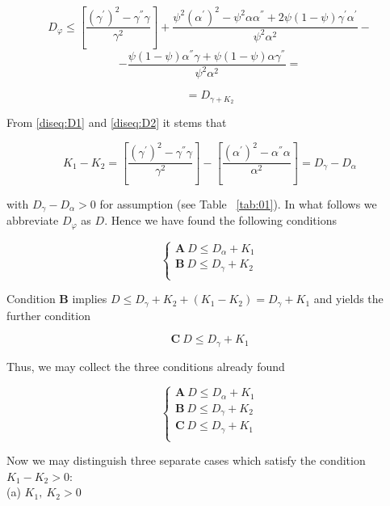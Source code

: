 \documentclass{statsoc}
\begin{document}
\begin{small}
$$ D_{\varphi} \le \left[\frac{(\gamma^{'})^2- \gamma^{''}\gamma}{\gamma^2} \right]+ \frac{\psi^2 (\alpha^{'})^2-\psi^2 \alpha
\alpha^{''}+2\psi(1- \psi) \gamma^{'}\alpha^{'}}{\psi^2\alpha^2}-$$
$$-\frac{\psi(1- \psi)\alpha^{''}\gamma+ \psi(1- \psi)\alpha\gamma^{''}}{\psi^2\alpha^2} =$$

\begin{equation}
=D_{\gamma+ K_{2}}
\label{diseq:D2}
\end{equation}

From \eqref{diseq:D1} and \eqref{diseq:D2} it stems  that

$$K_{1}-K_{2}= \left[\frac{(\gamma^{'})^2- \gamma^{''}\gamma}{\gamma^2} \right]- \left[\frac{(\alpha^{'})^2- \alpha^{''}\alpha}{\alpha^2} \right]= D_{\gamma}-D_{\alpha}$$

with $D_{\gamma}-D_{\alpha}>0$ for assumption (see Table~ \ref{tab:01}). In what follows we abbreviate $D_{\varphi}$ as $D$. Hence we have found the following conditions

\begin{equation}
\begin{cases}
\mathbf{A} \ D \le D_{\alpha}+ K_{1}\\
\mathbf{B} \ D \le D_{\gamma}+ K_{2}\\
\end{cases}
\label{diseq:system}
\end{equation}

Condition $\mathbf{B}$ implies $D \le D_{\gamma}+ K_{2}+(K_{1}-K_{2})=D_{\gamma}+K_{1}$ and yields the further condition

$$\mathbf{C} \ D \le D_{\gamma}+K_{1}$$

Thus, we may collect the three conditions already found

\begin{equation}
\begin{cases}
\mathbf{A} \ D \le D_{\alpha}+ K_{1}\\
\mathbf{B} \ D \le D_{\gamma}+ K_{2}\\
\mathbf{C} \ D \le D_{\gamma}+K_{1}\\
\end{cases}
\label{diseq:system2}
\end{equation}

Now we may distinguish three separate cases which satisfy the condition $K_{1}-K_{2}>0$:\\

(a) $ K_{1},\ K_{2}>0$


\end{small}
\end{document}
